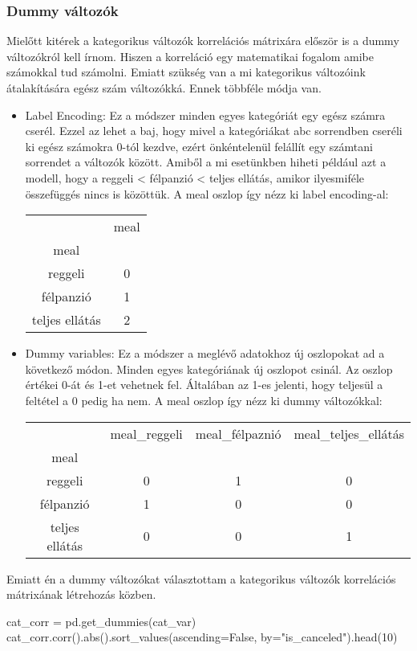 \subsubsection{Dummy változók}
Mielőtt kitérek a kategorikus változók korrelációs mátrixára először is a dummy változókról kell írnom. Hiszen a korreláció egy matematikai fogalom amibe számokkal tud számolni. Emiatt szükség van a mi kategorikus változóink átalakítására egész szám változókká. Ennek többféle módja van.
\begin{itemize}
    \item Label Encoding: Ez a módszer minden egyes kategóriát egy egész számra cserél. Ezzel az lehet a baj, hogy mivel a kategóriákat abc sorrendben cseréli ki egész számokra 0-tól kezdve, ezért önkéntelenül felállít egy számtani sorrendet a változók között. Amiből a mi esetünkben hiheti például azt a modell, hogy a 
    reggeli < félpanzió < teljes ellátás, amikor ilyesmiféle összefüggés nincs is közöttük. A meal oszlop így nézz ki label encoding-al:
    \begin{tabular}{ c c  }
      & meal \\ 
     meal &  \\  
      reggeli & 0 \\
      félpanzió & 1 \\
      teljes ellátás & 2
    \end{tabular}
    \item Dummy variables: Ez a módszer a meglévő adatokhoz új oszlopokat ad a következő módon. Minden egyes kategóriának új oszlopot csinál. Az oszlop értékei 0-át és 1-et vehetnek fel. Általában az 1-es jelenti, hogy teljesül a feltétel a 0 pedig ha nem. A meal oszlop így nézz ki dummy változókkal:
    
        \begin{tabular}{ c c c c }
          & meal\_reggeli & meal\_félpaznió & meal\_teljes\_ellátás \\ 
         meal &  \\  
          reggeli & 0  & 1 & 0\\
          félpanzió & 1  & 0 & 0\\
          teljes ellátás & 0 & 0 & 1
        \end{tabular}
\end{itemize}

Emiatt én a dummy változókat választottam a kategorikus változók korrelációs mátrixának létrehozás közben.

\begin{python}
cat_corr = pd.get_dummies(cat_var)
cat_corr.corr().abs().sort_values(ascending=False,
    by="is_canceled").head(10)
\end{python}

